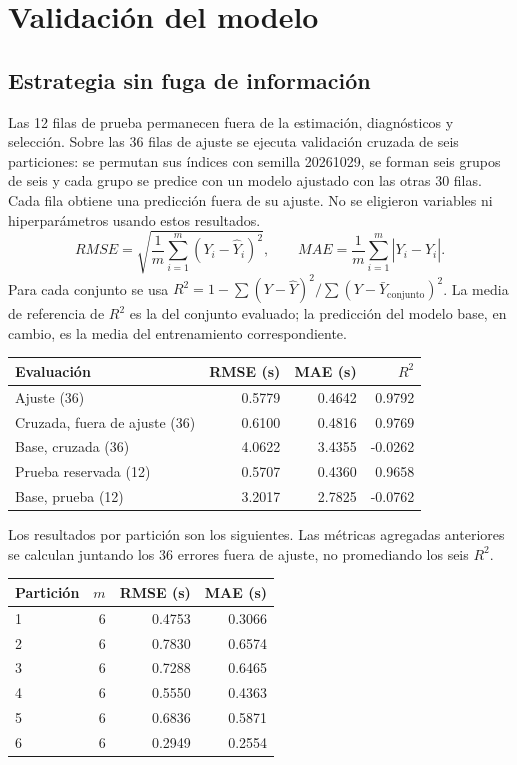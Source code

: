 \documentclass[11pt,a4paper]{article}
\begin{document}
\section{Validación del modelo}
\subsection{Estrategia sin fuga de información}
Las 12 filas de prueba permanecen fuera de la estimación, diagnósticos y selección. Sobre las 36 filas de ajuste se ejecuta validación cruzada de seis particiones: se permutan sus índices con semilla 20261029, se forman seis grupos de seis y cada grupo se predice con un modelo ajustado con las otras 30 filas. Cada fila obtiene una predicción fuera de su ajuste. No se eligieron variables ni hiperparámetros usando estos resultados.
\[
RMSE=\sqrt{\frac1m\sum_{i=1}^m(Y_i-\widehat Y_i)^2},\qquad
MAE=\frac1m\sum_{i=1}^m|Y_i-\widehat Y_i|.
\]
Para cada conjunto se usa $R^2=1-\sum(Y-\widehat Y)^2/\sum(Y-\bar Y_{\mathrm{conjunto}})^2$. La media de referencia de $R^2$ es la del conjunto evaluado; la predicción del modelo base, en cambio, es la media del entrenamiento correspondiente.
\begin{center}\begin{tabular}{lrrr}\toprule
Evaluación & RMSE (s) & MAE (s) & $R^2$\\\midrule
Ajuste (36) & 0.5779 & 0.4642 & 0.9792\\
Cruzada, fuera de ajuste (36) & 0.6100 & 0.4816 & 0.9769\\
Base, cruzada (36) & 4.0622 & 3.4355 & -0.0262\\
Prueba reservada (12) & 0.5707 & 0.4360 & 0.9658\\
Base, prueba (12) & 3.2017 & 2.7825 & -0.0762\\
\bottomrule\end{tabular}\end{center}
Los resultados por partición son los siguientes. Las métricas agregadas anteriores se calculan juntando los 36 errores fuera de ajuste, no promediando los seis $R^2$.
\begin{center}\begin{tabular}{lrrr}\toprule
Partición & $m$ & RMSE (s) & MAE (s)\\\midrule
1 & 6 & 0.4753 & 0.3066\\
2 & 6 & 0.7830 & 0.6574\\
3 & 6 & 0.7288 & 0.6465\\
4 & 6 & 0.5550 & 0.4363\\
5 & 6 & 0.6836 & 0.5871\\
6 & 6 & 0.2949 & 0.2554\\
\bottomrule\end{tabular}\end{center}
\end{document}
